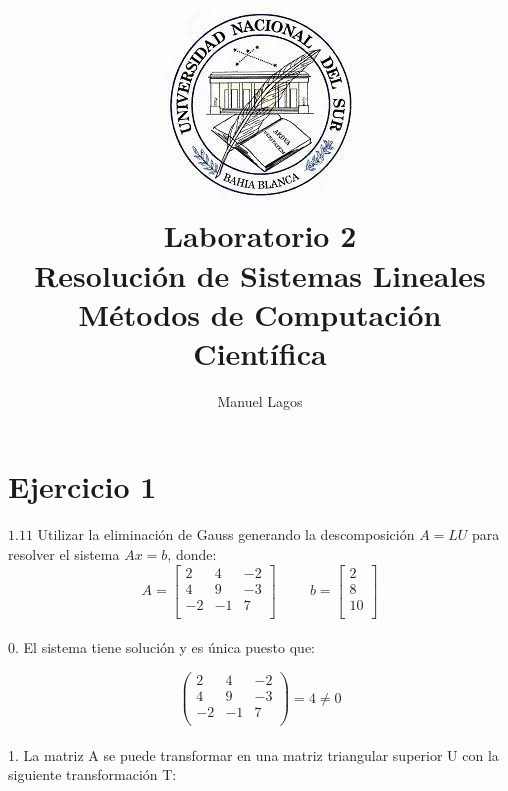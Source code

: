 \documentclass{article}
\title{\includegraphics[scale=0.5]{logo.jpg}\\ \textbf{Laboratorio 2} 
\\ \large Resolución de Sistemas Lineales            
\\ \large Métodos de Computación Científica}
\author{Manuel Lagos}
\begin{document}
\maketitle

\section{Ejercicio 1}
$1.11$ Utilizar la eliminación de Gauss generando la descomposición $A=LU$ para resolver el sistema $Ax=b$, donde: \\
\[
A=\begin{bmatrix}
2 & 4 & -2 \\
4 & 9 & -3 \\
-2 & -1 & 7 \\
\end{bmatrix} \hspace{1cm}
b=\begin{bmatrix}
2 \\
8 \\
10 \\
\end{bmatrix}
\]\\

0. El sistema tiene solución y es única puesto que:

\[\begin{pmatrix}
2 & 4 & -2 \\
4 & 9 & -3 \\
-2 & -1 & 7 \\
\end{pmatrix} = 4 \neq 0\]\\

1. La matriz A se puede transformar en una matriz triangular superior U con la siguiente transformación T:
\end{document}
